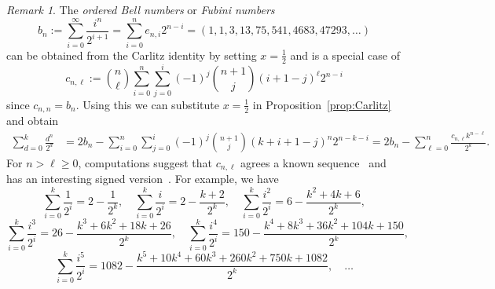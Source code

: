 \documentclass[10pt]{amsart}
\newtheorem{conjecture}[theorem]{Conjecture}
\theoremstyle{definition}
\theoremstyle{remark}
\newtheorem{remark}[theorem]{Remark}
\begin{document}
\begin{remark}
The \emph{ordered Bell numbers} or \emph{Fubini numbers}~\cite[A000670]{OEIS}
\begin{equation}\label{eq:Fubini}
b_n := \sum_{i=0}^\infty \frac{i^n}{2^{i+1}} =\sum_{i=0}^n e_{n,i}2^{n-i} = (1,1,3,13,75,541,4683,47293, \ldots)
\end{equation}
can be obtained from the Carlitz identity by setting $x=\frac12$
and is a special case of 
\[ c_{n,\ell} := \binom{n}{\ell} \sum_{i=0}^n \sum_{j=0}^{i} (-1)^j \binom{n+1}{j} (i+1-j)^\ell 2^{n-i} \]
since $c_{n,n}=b_n$.
Using this we can substitute $x=\frac12$ in Proposition~\ref{prop:Carlitz} and obtain
\begin{align*}
\sum_{d=0}^k \frac{d^n}{2^d} %
&= 2b_n -  \sum_{i=0}^n \sum_{j=0}^{i} (-1)^j \binom{n+1}{j} (k+i+1-j)^n 2^{n-k-i}  
= 2b_n - \sum_{\ell=0}^n \frac{c_{n,\ell} k^{n-\ell}}{2^k}.
\end{align*}
For $n>\ell\ge0$, computations suggest that $c_{n,\ell}$ agrees a known sequence~\cite[A202687]{OEIS} and has an interesting signed version~\cite[A162312]{OEIS}.
For example, we have
\[ \sum_{i=0}^k \frac{1}{2^i} = 2 - \frac{1}{2^k}, \quad
\sum_{i=0}^k \frac{i}{2^i} = 2 - \frac{k+2}{2^k}, \quad
\sum_{i=0}^k \frac{i^2}{2^i} = 6 - \frac{k^2+4k+6}{2^k}, \]
\[ \sum_{i=0}^k \frac{i^3}{2^i} = 26 - \frac{k^3+6k^2+18k+26}{2^k}, \quad
\sum_{i=0}^k \frac{i^4}{2^i} = 150 - \frac{k^4+8k^3+36k^2+104k+150}{2^k}, \]
\[ \sum_{i=0}^k \frac{i^5}{2^i} = 1082 - \frac{k^5+10k^4+60k^3+260k^2+750k+1082}{2^k}, \quad \ldots \]
\end{remark}

\end{document}

